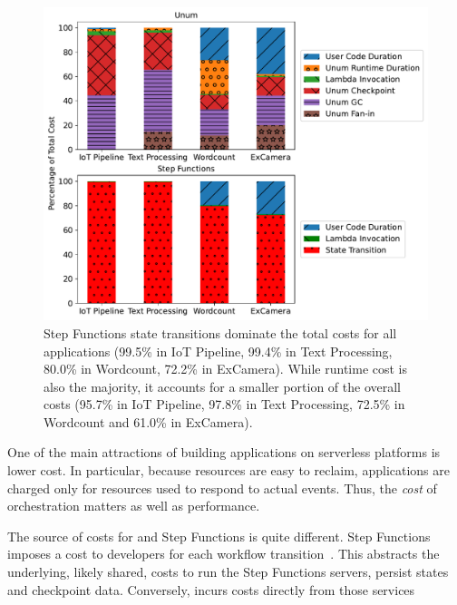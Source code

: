 \begin{figure}[t!]
    \centering
    \includegraphics[width=\columnwidth]{figures/AppCostBreakdown.pdf}
    \caption{Step Functions state transitions dominate the total costs for all
    applications (99.5\% in IoT Pipeline, 99.4\% in Text Processing, 80.0\% in
    Wordcount, 72.2\% in ExCamera). While \name{} runtime cost is also the
    majority, it accounts for a smaller portion of the overall costs (95.7\%
    in IoT Pipeline, 97.8\% in Text Processing, 72.5\%
    in Wordcount and 61.0\% in ExCamera).}
    \label{fig:cost-breakdown}
\end{figure}

One of the main attractions of building applications on serverless platforms
is  lower cost. In particular, because
resources are easy to reclaim, applications are charged only for resources
used to respond to actual events. Thus, the \emph{cost} of orchestration
matters as well as performance.

The source of costs for \name{} and Step Functions is quite different. Step
Functions imposes a cost to developers for each workflow
transition~\cite{aws-step-functions-pricing}. This abstracts the underlying, likely shared, costs to run the
Step Functions servers, persist states and checkpoint data. Conversely,
\name{} incurs costs directly from those services  

